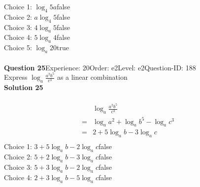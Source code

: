 \documentclass{article}
\begin{document}
Choice 1: \hspace{20pt}$\log_{4}5a$\hspace{20pt}false\\
Choice 2: \hspace{20pt}$a\log_{4}5$\hspace{20pt}false\\
Choice 3: \hspace{20pt}$4\log_{a}5$\hspace{20pt}false\\
Choice 4: \hspace{20pt}$5\log_{a}4$\hspace{20pt}false\\
Choice 5: \hspace{20pt}$\log_{a}20$\hspace{20pt}true\\
\\[4pt]
\noindent\textbf{Question 25}\hspace{20pt}Experience: 20\hspace{20pt}Order: e2\hspace{20pt}Level: e2\hspace{20pt}Question-ID: 188\\[2pt]
Express $\log_{a}\displaystyle\frac{a^2b^5}{c^3}$ as a linear combination\\[4pt]
\noindent\textbf{Solution 25}\\[2pt]
\\[-35pt]\begin{align*}
&\log_{a}\displaystyle\frac{a^2b^5}{c^3}\\[2pt]
=&\log_{a}a^2+\log_{a}b^5-\log_{a}c^3\\[2pt]
=&2+5\log_{a}b-3\log_{a}c\\[-50pt]
\end{align*}
Choice 1: \hspace{20pt}$3+5\log_{a}b-2\log_{a}c$\hspace{20pt}false\\
Choice 2: \hspace{20pt}$5+2\log_{a}b-3\log_{a}c$\hspace{20pt}false\\
Choice 3: \hspace{20pt}$5+3\log_{a}b-2\log_{a}c$\hspace{20pt}false\\
Choice 4: \hspace{20pt}$2+3\log_{a}b-5\log_{a}c$\hspace{20pt}false\\
\end{document}
